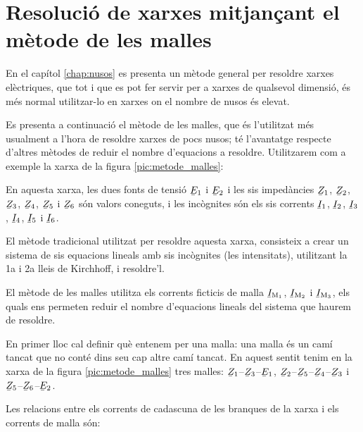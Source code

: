\section{Resolució de xarxes mitjançant el mètode de les malles}\label{sec:metode-malles}

En el capítol \ref{chap:nusos} es presenta un mètode general per resoldre xarxes elèctriques, que tot i que es pot fer servir per a xarxes de qualsevol dimensió, és més normal utilitzar-lo en xarxes on el nombre de nusos és elevat.

Es presenta a continuació el mètode de les malles, que és l'utilitzat més usualment a l'hora de resoldre xarxes de pocs nusos; té l'avantatge respecte d'altres mètodes de reduir el nombre d'equacions a resoldre. Utilitzarem com a exemple la xarxa de la figura \vref{pic:metode_malles}:

\begin{center}
    
     \label{pic:metode_malles}
\end{center}

En aquesta xarxa, les dues fonts de tensió $\cmplx{E}_1$ i $\cmplx{E}_2$ i les sis impedàncies $\cmplx{Z}_1$, $\cmplx{Z}_2$, $\cmplx{Z}_3$, $\cmplx{Z}_4$, $\cmplx{Z}_5$ i $\cmplx{Z}_6$  són valors coneguts, i les incògnites són els sis corrents $\cmplx{I}_1$, $\cmplx{I}_2$, $\cmplx{I}_3$, $\cmplx{I}_4$, $\cmplx{I}_5$ i $\cmplx{I}_6$.

El mètode tradicional utilitzat per  resoldre aquesta xarxa, consisteix a crear un sistema  de sis equacions lineals amb sis incògnites (les intensitats), utilitzant  la 1a i 2a lleis de Kirchhoff, i resoldre'l.

El mètode de les malles utilitza els corrents ficticis de malla $\cmplx{I}\ped{M_1}$, $\cmplx{I}\ped{M_2}$ i $\cmplx{I}\ped{M_3}$, els quals ens permeten reduir el nombre d'equacions lineals del  sistema que haurem de resoldre.



En primer lloc cal definir què entenem per una malla: una malla és un camí tancat que no conté dins seu cap altre camí tancat. En aquest sentit tenim en la xarxa de la figura \vref{pic:metode_malles} tres malles: $\cmplx{Z}_1$--$\cmplx{Z}_3$--$\cmplx{E}_1$, $\cmplx{Z}_2$--$\cmplx{Z}_5$--$\cmplx{Z}_4$--$\cmplx{Z}_3$ i $\cmplx{Z}_5$--$\cmplx{Z}_6$--$\cmplx{E}_2$.

Les relacions entre els corrents de cadascuna de les branques de la xarxa i els corrents de malla són:

